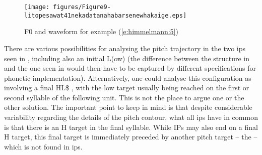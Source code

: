 \documentclass[output=paper
,modfonts
,nonflat]{langsci/langscibook}
\begin{document}
\begin{figure}
	\texttt{[image: figures/Figure9-litopesawat41nekadatanahabarsenewhakaige.eps]}
	\caption{F0 and waveform for example (\ref{e:himmelmann:5})}
	\label{f9}
\end{figure}

\noindent
There are various possibilities for analysing the pitch trajectory in the two ips seen in , including also an initial L(ow)  (the difference between the structure in  and the one seen in  would then have to be captured by different specifications for phonetic implementation). Alternatively, one could analyse this configuration as involving a final HL\$ , with the low target usually being reached on the first or second syllable of the following unit. This is not the place to argue one or the other solution. The important point to keep in mind is that despite considerable variability regarding the details of the pitch contour, what all ips have in common is that there is an H target in the final syllable. While IPs may also end on a final H target, this final target is immediately preceded by another pitch target – the  – which is not found in ips.
\end{document}
